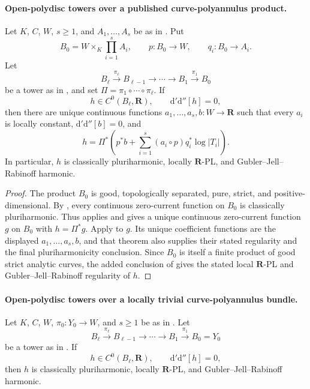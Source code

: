 \paragraph{Open-polydisc towers over a published curve-polyannulus product.}
\begin{corollary}
\label{cor:p062-annulus-base-open-polydisc-towers}
\label{cor:p062-polyannulus-base-open-polydisc-towers}
Let \(K\), \(C\), \(W\), \(s\geq1\), and \(A_1,\ldots,A_s\) be as in
.  Put
\[
 B_0=W\times_K\prod_{i=1}^sA_i,
 \qquad p:B_0\longrightarrow W,
 \qquad q_i:B_0\longrightarrow A_i.
\]
Let
\[
 B_\ell\xrightarrow{\pi_\ell}B_{\ell-1}
 \longrightarrow\cdots\longrightarrow B_1
 \xrightarrow{\pi_1}B_0
\]
be a tower as in
, and set
\(\Pi=\pi_1\circ\cdots\circ\pi_\ell\).  If
\[
 h\in C^0(B_\ell,\mathbf R),
 \qquad \mathrm d'\mathrm d''[h]=0,
\]
then there are unique continuous functions
\(a_1,\ldots,a_s,b:W\to\mathbf R\) such that every \(a_i\) is locally
constant, \(\mathrm d'\mathrm d''[b]=0\), and
\[
 h=\Pi^*\left(p^*b+
       \sum_{i=1}^s(a_i\circ p)q_i^*\log|T_i|\right).
\]
In particular, \(h\) is classically pluriharmonic, locally
\(\mathbf R\)-PL, and Gubler--Jell--Rabinoff harmonic.
\end{corollary}

\begin{proof}
The product \(B_0\) is good, topologically separated, pure, strict, and
positive-dimensional.  By
, every continuous
zero-current function on \(B_0\) is classically pluriharmonic.  Thus
 applies and gives
a unique continuous zero-current function \(g\) on \(B_0\) with
\(h=\Pi^*g\).  Apply
 to \(g\).  Its unique
coefficient functions are the displayed \(a_1,\ldots,a_s,b\), and that theorem also
supplies their stated regularity and the final pluriharmonicity conclusion.
Since \(B_0\) is itself a finite product of good strict analytic curves,
the added conclusion of
 gives the stated
local \(\mathbf R\)-PL and Gubler--Jell--Rabinoff regularity of \(h\).
\end{proof}

\paragraph{Open-polydisc towers over a locally trivial curve-polyannulus bundle.}
\begin{corollary}
\label{cor:p062-open-polyannulus-bundle-open-polydisc-towers}
Let \(K\), \(C\), \(W\), \(\pi_0:Y_0\to W\), and \(s\geq1\) be as in
.  Let
\[
 B_\ell\xrightarrow{\pi_\ell}B_{\ell-1}
 \longrightarrow\cdots\longrightarrow B_1
 \xrightarrow{\pi_1}B_0=Y_0
\]
be a tower as in
.  If
\[
 h\in C^0(B_\ell,\mathbf R),
 \qquad \mathrm d'\mathrm d''[h]=0,
\]
then \(h\) is classically pluriharmonic, locally \(\mathbf R\)-PL, and
Gubler--Jell--Rabinoff harmonic.
\end{corollary}

